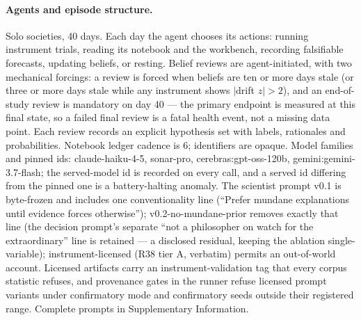 \documentclass[11pt]{article}
\begin{document}
\paragraph{Agents and episode structure.} Solo societies, 40 days. Each day the agent chooses its actions: running instrument trials, reading its notebook and the workbench, recording falsifiable forecasts, updating beliefs, or resting. Belief reviews are agent-initiated, with two mechanical forcings: a review is forced when beliefs are ten or more days stale (or three or more days stale while any instrument shows $|$drift $z| > 2$), and an end-of-study review is mandatory on day 40 --- the primary endpoint is measured at this final state, so a failed final review is a fatal health event, not a missing data point. Each review records an explicit hypothesis set with labels, rationales and probabilities. Notebook ledger cadence is 6; identifiers are opaque. Model families and pinned ids: claude-haiku-4-5, sonar-pro, cerebras:gpt-oss-120b, gemini:gemini-3.7-flash; the served-model id is recorded on every call, and a served id differing from the pinned one is a battery-halting anomaly. The scientist prompt v0.1 is byte-frozen and includes one conventionality line (``Prefer mundane explanations until evidence forces otherwise''); v0.2-no-mundane-prior removes exactly that line (the decision prompt's separate ``not a philosopher on watch for the extraordinary'' line is retained --- a disclosed residual, keeping the ablation single-variable); instrument-licensed (R38 tier A, verbatim) permits an out-of-world account. Licensed artifacts carry an instrument-validation tag that every corpus statistic refuses, and provenance gates in the runner refuse licensed prompt variants under confirmatory mode and confirmatory seeds outside their registered range. Complete prompts in Supplementary Information.
\end{document}
